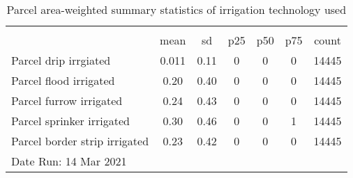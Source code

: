 \begin{table}[htbp]\centering
\def\sym#1{\ifmmode^{#1}\else\(^{#1}\)\fi}
\caption{Parcel area-weighted summary statistics of irrigation technology used}
\begin{tabular*}{1.0\hsize}{@{\hskip\tabcolsep\extracolsep\fill}l*{1}{cccccc}}
\toprule
                                    &\multicolumn{6}{c}{}                                                         \\
                                    &        mean&          sd&         p25&         p50&         p75&       count\\
\midrule
Parcel drip irrgiated               &       0.011&        0.11&           0&           0&           0&       14445\\
Parcel flood irrigated              &        0.20&        0.40&           0&           0&           0&       14445\\
Parcel furrow irrigated             &        0.24&        0.43&           0&           0&           0&       14445\\
Parcel sprinker irrigated           &        0.30&        0.46&           0&           0&           1&       14445\\
Parcel border strip irrigated       &        0.23&        0.42&           0&           0&           0&       14445\\
\bottomrule
\multicolumn{7}{l}{\footnotesize Date Run: 14 Mar 2021}\\
\end{tabular*}
\end{table}
